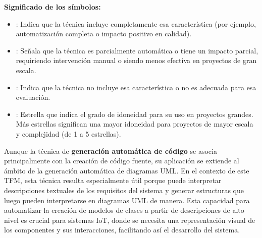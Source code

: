 \textbf{Significado de los símbolos:}

\begin{itemize}
	\item {}: Indica que la técnica incluye completamente esa característica (por ejemplo, automatización completa o impacto positivo en calidad).
	\item \faMinus: Señala que la técnica es parcialmente automática o tiene un impacto parcial, requiriendo intervención manual o siendo menos efectiva en proyectos de gran escala.
	\item {}: Indica que la técnica no incluye esa característica o no es adecuada para esa evaluación.
	\item {}: Estrella que indica el grado de idoneidad para su uso en proyectos grandes. Más estrellas significan una mayor idoneidad para proyectos de mayor escala y complejidad (de 1 a 5 estrellas).
\end{itemize}

Aunque la técnica de \textbf{generación automática de código} se asocia principalmente con la creación de código fuente, su aplicación se extiende al ámbito de la generación automática de diagramas UML. En el contexto de este TFM, esta técnica resulta especialmente útil porque puede interpretar descripciones textuales de los requisitos del sistema y generar estructuras que luego pueden interpretarse en diagramas UML de manera. Esta capacidad para automatizar la creación de modelos de clases a partir de descripciones de alto nivel es crucial para sistemas IoT, donde se necesita una representación visual de los componentes y sus interacciones, facilitando así el desarrollo del sistema.



